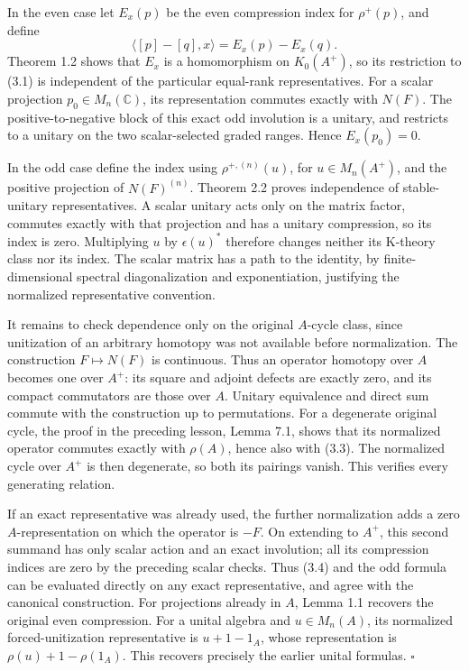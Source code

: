 \documentclass[
  11pt,
]{article}
\begin{document}
In the even case let \(E_x(p)\) be the even compression index for
\(\rho^+(p)\), and define \[
\langle[p]-[q],x\rangle=E_x(p)-E_x(q).
\tag{3.4}
\] Theorem 1.2 shows that \(E_x\) is a homomorphism on \(K_0(A^+)\), so
its restriction to (3.1) is independent of the particular equal-rank
representatives. For a scalar projection \(p_0\in M_n(\mathbb C)\), its
representation commutes exactly with \(N(F)\). The positive-to-negative
block of this exact odd involution is a unitary, and restricts to a
unitary on the two scalar-selected graded ranges. Hence \(E_x(p_0)=0\).

In the odd case define the index using \(\rho^{+,(n)}(u)\), for
\(u\in M_n(A^+)\), and the positive projection of \(N(F)^{(n)}\).
Theorem 2.2 proves independence of stable-unitary representatives. A
scalar unitary acts only on the matrix factor, commutes exactly with
that projection and has a unitary compression, so its index is zero.
Multiplying \(u\) by \(\epsilon(u)^*\) therefore changes neither its
K-theory class nor its index. The scalar matrix has a path to the
identity, by finite-dimensional spectral diagonalization and
exponentiation, justifying the normalized representative convention.

It remains to check dependence only on the original \(A\)-cycle class,
since unitization of an arbitrary homotopy was not available before
normalization. The construction \(F\mapsto N(F)\) is continuous. Thus an
operator homotopy over \(A\) becomes one over \(A^+\): its square and
adjoint defects are exactly zero, and its compact commutators are those
over \(A\). Unitary equivalence and direct sum commute with the
construction up to permutations. For a degenerate original cycle, the
proof in the preceding lesson, Lemma 7.1, shows that its normalized
operator commutes exactly with \(\rho(A)\), hence also with (3.3). The
normalized cycle over \(A^+\) is then degenerate, so both its pairings
vanish. This verifies every generating relation.

If an exact representative was already used, the further normalization
adds a zero \(A\)-representation on which the operator is \(-F\). On
extending to \(A^+\), this second summand has only scalar action and an
exact involution; all its compression indices are zero by the preceding
scalar checks. Thus (3.4) and the odd formula can be evaluated directly
on any exact representative, and agree with the canonical construction.
For projections already in \(A\), Lemma 1.1 recovers the original even
compression. For a unital algebra and \(u\in M_n(A)\), its normalized
forced-unitization representative is \(u+1-1_A\), whose representation
is \(\rho(u)+1-\rho(1_A)\). This recovers precisely the earlier unital
formulas. \(\square\)
\end{document}
